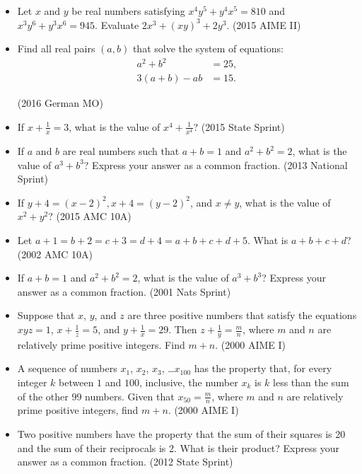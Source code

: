 \documentclass{article}
\begin{document}
\begin{itemize}

\item Let $x$ and $y$ be real numbers satisfying $x^4y^5+y^4x^5=810$ and $x^3y^6+y^3x^6=945$. Evaluate $2x^3+(xy)^3+2y^3$. (2015 AIME II)

\item Find all real pairs $(a,b)$ that solve the system of equations:
\begin{align*}
a^2+b^2 &=25,\\
3(a+b)-ab &=15.
\end{align*}

(2016 German MO)

\item If $x+\frac{1}{x}=3$, what is the value of $x^4+\frac{1}{x^4}$? (2015 State Sprint)

\item If $a$ and $b$ are real numbers such that $a+b=1$ and $a^2+b^2=2$, what is the value of $a^3+b^3$? Express your answer as a common fraction. (2013 National Sprint)


\item If $y+4 = (x-2)^2, x+4 = (y-2)^2$, and $x \neq y$, what is the value of $x^2+y^2$? (2015 AMC 10A)

\item Let $a + 1 = b + 2 = c + 3 = d + 4 = a + b + c + d + 5$. What is $a + b + c + d$? (2002 AMC 10A)


\item If $a+b=1$ and $a^2+b^2=2$, what is the value of $a^3+b^3$? Express your answer as a common fraction. (2001 Nats Sprint)

\item Suppose that $x$, $y$, and $z$ are three positive numbers that satisfy the equations $xyz=1$, $x+\frac{1}{z}=5$, and $y+\frac{1}{x}=29$. Then $z+\frac{1}{y}=\frac{m}{n}$, where $m$ and $n$ are relatively prime positive integers. Find $m+n$. (2000 AIME I)

\item A sequence of numbers $x_1$, $x_2$, $x_3$, \ldots $x_{100}$ has the property that, for every integer $k$ between $1$ and $100$, inclusive, the number $x_k$ is $k$ less than the sum of the other $99$ numbers. Given that $x_{50}=\frac{m}{n}$, where $m$ and $n$ are relatively prime positive integers, find $m+n$. (2000 AIME I)

\item Two positive numbers have the property that the sum of their squares is 20 and the sum of their reciprocals is 2. What is their product? Express your answer as a common fraction. (2012 State Sprint)


\end{itemize}
\end{document}
